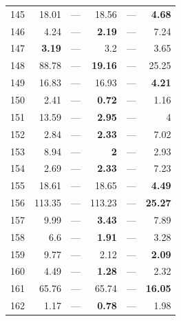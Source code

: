 \begin{longtable}{lr@{\hskip 4pt}l@{\hskip 12pt}r@{\hskip 4pt}l@{\hskip 12pt}r}
145 & 18.01 & --- & 18.56 & --- & \textbf{4.68} \\
146 & 4.24 & --- & \textbf{2.19} & --- & 7.24 \\
147 & \textbf{3.19} & --- & 3.2 & --- & 3.65 \\
148 & 88.78 & --- & \textbf{19.16} & --- & 25.25 \\
149 & 16.83 & --- & 16.93 & --- & \textbf{4.21} \\
150 & 2.41 & --- & \textbf{0.72} & --- & 1.16 \\
151 & 13.59 & --- & \textbf{2.95} & --- & 4 \\
152 & 2.84 & --- & \textbf{2.33} & --- & 7.02 \\
153 & 8.94 & --- & \textbf{2} & --- & 2.93 \\
154 & 2.69 & --- & \textbf{2.33} & --- & 7.23 \\
155 & 18.61 & --- & 18.65 & --- & \textbf{4.49} \\
156 & 113.35 & --- & 113.23 & --- & \textbf{25.27} \\
157 & 9.99 & --- & \textbf{3.43} & --- & 7.89 \\
158 & 6.6 & --- & \textbf{1.91} & --- & 3.28 \\
159 & 9.77 & --- & 2.12 & --- & \textbf{2.09} \\
160 & 4.49 & --- & \textbf{1.28} & --- & 2.32 \\
161 & 65.76 & --- & 65.74 & --- & \textbf{16.05} \\
162 & 1.17 & --- & \textbf{0.78} & --- & 1.98 \\
\bottomrule
\end{longtable}